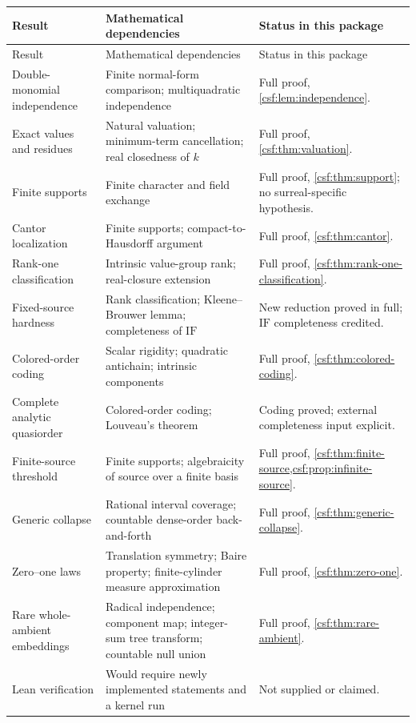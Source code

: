 \documentclass[11pt,a4paper]{article}
\numberwithin{equation}{section}
\theoremstyle{definition}
\theoremstyle{remark}
\newcommand{\IF}{\mathrm{IF}}
\begin{document}
\begin{longtable}{P{0.25\textwidth}P{0.38\textwidth}P{0.28\textwidth}}
\toprule
Result & Mathematical dependencies & Status in this package\\
\midrule
\endfirsthead
\toprule
Result & Mathematical dependencies & Status in this package\\
\midrule
\endhead
Double-monomial independence & Finite normal-form comparison; multiquadratic
independence & Full proof, \cref{csf:lem:independence}.\\[4pt]
Exact values and residues & Natural valuation; minimum-term cancellation;
real closedness of $k$ & Full proof, \cref{csf:thm:valuation}.\\[4pt]
Finite supports & Finite character and field exchange & Full proof,
\cref{csf:thm:support}; no surreal-specific hypothesis.\\[4pt]
Cantor localization & Finite supports; compact-to-Hausdorff argument & Full
proof, \cref{csf:thm:cantor}.\\[4pt]
Rank-one classification & Intrinsic value-group rank; real-closure extension
& Full proof, \cref{csf:thm:rank-one-classification}.\\[4pt]
Fixed-source hardness & Rank classification; Kleene--Brouwer lemma;
completeness of $\IF$ & New reduction proved in full; $\IF$ completeness
credited.\\[4pt]
Colored-order coding & Scalar rigidity; quadratic antichain; intrinsic
components & Full proof, \cref{csf:thm:colored-coding}.\\[4pt]
Complete analytic quasiorder & Colored-order coding; Louveau's theorem &
Coding proved; external completeness input explicit.\\[4pt]
Finite-source threshold & Finite supports; algebraicity of source over a
finite basis & Full proof, \cref{csf:thm:finite-source,csf:prop:infinite-source}.\\[4pt]
Generic collapse & Rational interval coverage; countable dense-order
back-and-forth & Full proof, \cref{csf:thm:generic-collapse}.\\[4pt]
Zero--one laws & Translation symmetry; Baire property; finite-cylinder
measure approximation & Full proof, \cref{csf:thm:zero-one}.\\[4pt]
Rare whole-ambient embeddings & Radical independence; component map;
integer-sum tree transform; countable null union & Full proof,
\cref{csf:thm:rare-ambient}.\\[4pt]
Lean verification & Would require newly implemented statements and a
kernel run & Not supplied or claimed.\\
\bottomrule
\end{longtable}
\end{document}
